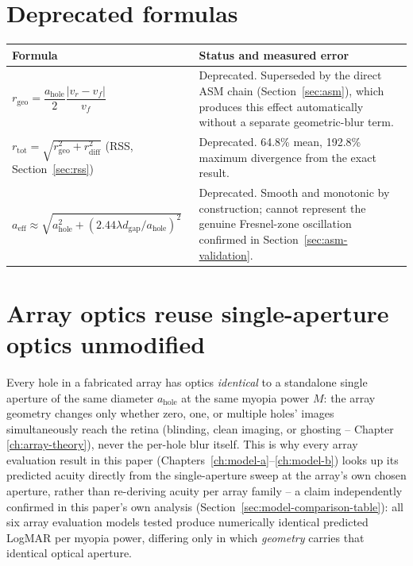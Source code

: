 \section{Deprecated formulas}
\label{sec:deprecated}
\begin{center}
\begin{tabular}{p{5.4cm}p{7.4cm}}
\toprule
Formula & Status and measured error \\
\midrule
$r_{\mathrm{geo}} = \dfrac{a_{\mathrm{hole}}}{2}\dfrac{|v_r-v_f|}{v_f}$ & Deprecated.
Superseded by the direct ASM chain (Section~\ref{sec:asm}), which produces this effect
automatically without a separate geometric-blur term. \\
$r_{\mathrm{tot}}=\sqrt{r_{\mathrm{geo}}^2+r_{\mathrm{diff}}^2}$ (RSS,
Section~\ref{sec:rss}) & Deprecated. 64.8\% mean, 192.8\% maximum divergence from the
exact result. \\
$a_{\mathrm{eff}}\approx\sqrt{a_{\mathrm{hole}}^2+(2.44\lambda d_{\mathrm{gap}}/a_{\mathrm{hole}})^2}$
& Deprecated. Smooth and monotonic by construction; cannot represent the genuine
Fresnel-zone oscillation confirmed in Section~\ref{sec:asm-validation}. \\
\bottomrule
\end{tabular}
\end{center}

\section{Array optics reuse single-aperture optics unmodified}
\label{sec:array-vs-single}
Every hole in a fabricated array has optics \emph{identical} to a standalone single
aperture of the same diameter $a_{\mathrm{hole}}$ at the same myopia power $M$: the
array geometry changes only whether zero, one, or multiple holes' images
simultaneously reach the retina (blinding, clean imaging, or ghosting -- Chapter
\ref{ch:array-theory}), never the per-hole blur itself. This is why every array
evaluation result in this paper (Chapters~\ref{ch:model-a}--\ref{ch:model-b}) looks up
its predicted acuity directly from the single-aperture sweep at the array's own chosen
aperture, rather than re-deriving acuity per array family -- a claim independently
confirmed in this paper's own analysis (Section~\ref{sec:model-comparison-table}): all
six array evaluation models tested produce numerically identical predicted LogMAR per
myopia power, differing only in which \emph{geometry} carries that identical optical
aperture.
